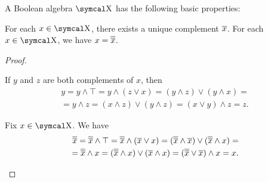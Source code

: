 \begin{proposition}\label{thm:boolean_algebra_properties}
  A Boolean algebra \( \CX \) has the following basic properties:
  \begin{propenum}
     For each \( x \in \CX \), there exists a unique complement \( \overline{x} \).
     For each \( x \in \CX \), we have \( x = \overline{\overline{x}} \).
  \end{propenum}
\end{proposition}
\begin{proof}\mbox{}
  \begin{itemize}
     If \( y \) and \( z \) are both complements of \( x \), then
    \begin{align*}
      y
      =
      y \wedge \top
      =
      y \wedge (z \vee x)
      =
      (y \wedge z) \vee (y \wedge x)
      = \\ =
      y \wedge z
      =
      (x \wedge z) \vee (y \wedge z)
      =
      (x \vee y) \wedge z
      =
      z.
    \end{align*}

     Fix \( x \in \CX \). We have
    \begin{align*}
      \overline{\overline{x}}
      =
      \overline{\overline{x}} \wedge \top
      =
      \overline{\overline{x}} \wedge (\overline{x} \vee x)
      =
      (\overline{\overline{x}} \wedge \overline{x}) \vee (\overline{\overline{x}} \wedge x)
      = \\ =
      \overline{\overline{x}} \wedge x
      =
      (\overline{\overline{x}} \wedge x) \vee (\overline{x} \wedge x)
      =
      (\overline{\overline{x}} \vee \overline{x}) \wedge x
      =
      x.
    \end{align*}
  \end{itemize}
\end{proof}

